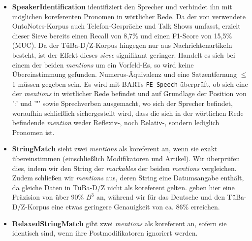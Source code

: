\documentclass{scrartcl}
\begin{document}
\begin{itemize}

\item \textbf{SpeakerIdentification} identifiziert den Sprecher und verbindet ihn mit möglichen koreferenten Pronomen in wörtlicher Rede. Da der von  verwendete OntoNotes-Korpus auch Telefon-Gespräche und Talk Shows umfasst, erzielt dieser Sieve bereits einen Recall von 8,7\% und einen F1-Score von 15,5\% (MUC). Da der TüBa-D/Z-Korpus hingegen nur aus Nachrichtenartikeln besteht, ist der Effekt dieses \textit{sieve} signifikant geringer. Handelt es sich bei einem der beiden \textit{mentions} um ein Vorfeld-Es, so wird keine Übereinstimmung gefunden. Numerus-Äquivalenz und eine Satzentfernung ${\leq}$ 1 müssen gegeben sein. Es wird mit BARTs \texttt{FE\_Speech} überprüft, ob sich eine der \textit{mentions} in wörtlicher Rede befindet und auf Grundlage der Position von ':' und '"' sowie Sprechverben ausgemacht, wo sich der Sprecher befindet, woraufhin schließlich sichergestellt wird, dass die sich in der wörtlichen Rede befindende \textit{mention} weder Reflexiv-, noch Relativ-, sondern lediglich Pronomen ist.

\item \textbf{StringMatch} sieht zwei \textit{mentions} als koreferent an, wenn sie exakt übereinstimmen (einschließlich Modifikatoren und Artikel). Wir überprüfen dies, indem wir den String der \textit{markables} der beiden \textit{mentions} vergleichen. Zudem schließen wir \textit{mentions} aus, deren String eine Datumsangabe enthält, da gleiche Daten in TüBa-D/Z nicht als koreferent gelten. geben hier eine Präzision von über 90\% $B^3$ an, während wir für das Deutsche und den TüBa-D/Z-Korpus eine etwas geringere Genauigkeit von ca. 86\% erreichen.

\item \textbf{RelaxedStringMatch} gibt zwei \textit{mentions} als koreferent an, sofern sie identisch sind, wenn ihre Postmodifikatoren ignoriert werden.


\end{itemize}
\end{document}
